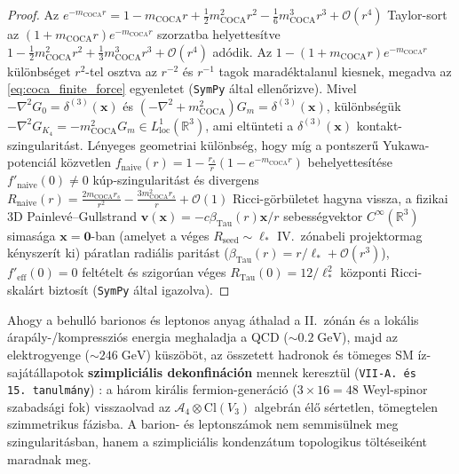 \documentclass[11pt,a4paper]{article}
\theoremstyle{remark}
\begin{document}
\begin{proof}
Az $e^{-m_{\mathrm{COCA}}r} = 1 - m_{\mathrm{COCA}}r + \frac{1}{2}m_{\mathrm{COCA}}^2 r^2 - \frac{1}{6}m_{\mathrm{COCA}}^3 r^3 + \mathcal{O}(r^4)$ Taylor-sort az $(1 + m_{\mathrm{COCA}}r)e^{-m_{\mathrm{COCA}}r}$ szorzatba helyettes\'itve $1 - \frac{1}{2}m_{\mathrm{COCA}}^2 r^2 + \frac{1}{3}m_{\mathrm{COCA}}^3 r^3 + \mathcal{O}(r^4)$ ad\'odik. Az $1 - (1 + m_{\mathrm{COCA}}r)e^{-m_{\mathrm{COCA}}r}$ k\"ul\"onbs\'eget $r^2$-tel osztva az $r^{-2}$ \'es $r^{-1}$ tagok marad\'ektalanul kiesnek, megadva az \eqref{eq:coca_finite_force} egyenletet (\texttt{SymPy} \'altal ellen\H{o}rizve). Mivel $-\nabla^2 G_0 = \delta^{(3)}(\mathbf{x})$ \'es $(-\nabla^2 + m_{\mathrm{COCA}}^2)G_m = \delta^{(3)}(\mathbf{x})$, k\"ul\"onbs\'eg\"uk $-\nabla^2 G_{K_4} = -m_{\mathrm{COCA}}^2 G_m \in L^1_{\mathrm{loc}}(\mathbb{R}^3)$, ami elt\"unteti a $\delta^{(3)}(\mathbf{x})$ kontakt-szingularit\'ast. L\'enyeges geometriai k\"ul\"onbs\'eg, hogy m\'ig a pontszer\H{u} Yukawa-potenci\'al k\"ozvetlen $f_{\mathrm{naive}}(r) = 1 - \frac{r_s}{r}(1 - e^{-m_{\mathrm{COCA}}r})$ behelyettes\'it\'ese $f'_{\mathrm{naive}}(0) \neq 0$ k\'up-szingularit\'ast \'es divergens $R_{\mathrm{naive}}(r) = \frac{2m_{\mathrm{COCA}}r_s}{r^2} - \frac{3m_{\mathrm{COCA}}^2 r_s}{r} + \mathcal{O}(1)$ Ricci-g\"orb\"uletet hagyna vissza, a fizikai 3D Painlev\'e--Gullstrand $\mathbf{v}(\mathbf{x}) = -c\beta_{\mathrm{Tau}}(r)\mathbf{x}/r$ sebess\'egvektor $C^\infty(\mathbb{R}^3)$ simas\'aga $\mathbf{x} = \mathbf{0}$-ban (amelyet a v\'eges $R_{\mathrm{seed}} \sim \ell_*$ IV.\ z\'onabeli projektormag k\'enyszer\'it ki) p\'aratlan radi\'alis parit\'ast ($\beta_{\mathrm{Tau}}(r) = r/\ell_* + \mathcal{O}(r^3)$), $f'_{\mathrm{eff}}(0) = 0$ felt\'etelt \'es szigor\'uan v\'eges $R_{\mathrm{Tau}}(0) = 12/\ell_*^2$ k\"ozponti Ricci-skal\'art biztos\'it (\texttt{SymPy} \'altal igazolva).
\end{proof}

Ahogy a behull\'o barionos \'es leptonos anyag \'athalad a II.\ z\'on\'an \'es a lok\'alis \'arap\'aly-/kompresszi\'os energia meghaladja a QCD ($\sim 0.2\;\mathrm{GeV}$), majd az elektrogyenge ($\sim 246\;\mathrm{GeV}$) k\"usz\"ob\"ot, az \"osszetett hadronok \'es t\"omeges SM \'iz-saj\'at\'allapotok \textbf{szimplici\'alis dekonfin\'aci\'on} mennek kereszt\"ul (\texttt{VII-A.\ \'es 15.\ tanulm\'any}) \cite{JolcsakTauFoundationSeries2026}: a h\'arom kir\'alis fermion-gener\'aci\'o ($3 \times 16 = 48$ Weyl-spinor szabads\'agi fok) visszaolvad az $\mathcal{A}_4 \otimes \mathrm{Cl}(V_3)$ algebr\'an \'el\H{o} s\'ertetlen, t\"omegtelen szimmetrikus f\'azisba. A barion- \'es leptonsz\'amok nem semmis\"ulnek meg szingularit\'asban, hanem a szimplici\'alis kondenz\'atum topologikus t\"olt\'eseik\'ent maradnak meg.
\end{document}
